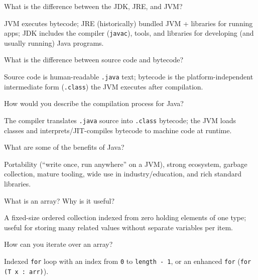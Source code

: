 \newpage


\question[4]
What is the difference between the JDK, JRE, and JVM?
\begin{solutionorbox}[1.45in]
  JVM executes bytecode; JRE (historically) bundled JVM + libraries for running apps; JDK includes the compiler (\texttt{javac}), tools, and libraries for developing (and usually running) Java programs.
\end{solutionorbox}

\question[4]
What is the difference between source code and bytecode?
\begin{solutionorbox}[1.15in]
  Source code is human-readable \texttt{.java} text; bytecode is the platform-independent intermediate form (\texttt{.class}) the JVM executes after compilation.
\end{solutionorbox}

\question[4]
How would you describe the compilation process for Java?
\begin{solutionorbox}[1.35in]
  The compiler translates \texttt{.java} source into \texttt{.class} bytecode; the JVM loads classes and interprets/JIT-compiles bytecode to machine code at runtime.
\end{solutionorbox}

\newpage

\question[4]
What are some of the benefits of Java?
\begin{solutionorbox}[1.35in]
  Portability (``write once, run anywhere'' on a JVM), strong ecosystem, garbage collection, mature tooling, wide use in industry/education, and rich standard libraries.
\end{solutionorbox}

\question[4]
What is an array? Why is it useful?
\begin{solutionorbox}[1.25in]
  A fixed-size ordered collection indexed from zero holding elements of one type; useful for storing many related values without separate variables per item.
\end{solutionorbox}

\question[4]
How can you iterate over an array?
\begin{solutionorbox}[1.15in]
  Indexed \texttt{for} loop with an index from \texttt{0} to \texttt{length - 1}, or an enhanced \texttt{for} (\texttt{for (T x : arr)}).
\end{solutionorbox}

